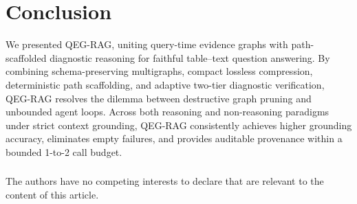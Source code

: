 \documentclass[runningheads]{llncs}
\begin{document}
\section{Conclusion}
\label{sec:conclusion}
We presented QEG-RAG, uniting query-time evidence graphs with path-scaffolded diagnostic reasoning for faithful table--text question answering. By combining schema-preserving multigraphs, compact lossless compression, deterministic path scaffolding, and adaptive two-tier diagnostic verification, QEG-RAG resolves the dilemma between destructive graph pruning and unbounded agent loops. Across both reasoning and non-reasoning paradigms under strict context grounding, QEG-RAG consistently achieves higher grounding accuracy, eliminates empty failures, and provides auditable provenance within a bounded 1-to-2 call budget.

\begin{credits}
\subsubsection{\discintname}
The authors have no competing interests to declare that are relevant to the content of this article.
\end{credits}

\enlargethispage{4.0\baselineskip}
\makeatletter
\renewenvironment{thebibliography}[1]
     {\section*{\refname}%
      \def\@biblabel##1{##1.}%
      \fontsize{6.1pt}{7.1pt}\selectfont
      \list{\@biblabel{\@arabic\c@enumiv}}%
           {\settowidth\labelwidth{\@biblabel{#1}}%
            \leftmargin\labelwidth
            \advance\leftmargin\labelsep
            \setlength{\itemsep}{-1.2pt plus 0.2pt}%
            \setlength{\parsep}{0pt}%
            \setlength{\topsep}{0.5pt}%
            \usecounter{enumiv}%
            \let\p@enumiv\@empty
            \renewcommand\theenumiv{\@arabic\c@enumiv}}%
      \renewcommand\newblock{\hskip .11em \@plus.33em \@minus.07em}%
      \sloppy\clubpenalty4000\widowpenalty4000%
      \sfcode`\.=1000\relax}
     {\def\@noitemerr
       {\@latex@warning{Empty `thebibliography' environment}}%
      \endlist}
\makeatother


\end{document}
